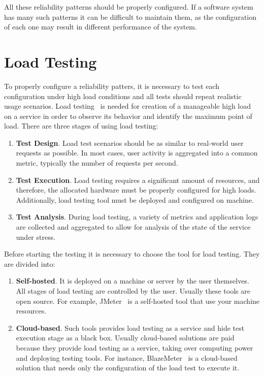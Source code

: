 All these reliability patterns should be properly configured. If a software system has many such patterns it can be difficult to maintain them, as the configuration of each one may result in different performance of the system.

\section{Load Testing}\label{sec:load-testing}
To properly configure a reliability patters, it is necessary to test each configuration under high load conditions and all tests should repeat realistic usage scenarios. Load testing~\cite{load_testing_tips} is needed for creation of a manageable high load on a service in order to observe its behavior and identify the maximum point of load. There are three stages of using load testing:

\begin{enumerate}
    \item \textbf{Test Design}. Load test scenarios should be as similar to real-world user requests as possible. In most cases, user activity is aggregated into a common metric, typically the number of requests per second.
    \item \textbf{Test Execution}. Load testing requires a significant amount of resources, and therefore, the allocated hardware must be properly configured for high loads. Additionally, load testing tool must be deployed and configured on machine.
    \item \textbf{Test Analysis}. During load testing, a variety of metrics and application logs are collected and aggregated to allow for analysis of the state of the service under stress.
\end{enumerate}

Before starting the testing it is necessary to choose the tool for load testing. They are divided into:
\begin{enumerate}
    \item \textbf{Self-hosted}. It is deployed on a machine or server by the user themselves. All stages of load testing are controlled by the user. Usually these tools are open source. For example, JMeter~\cite{jmeter} is a self-hosted tool that use your machine resources.
    \item \textbf{Cloud-based}. Such tools provides load testing as a service and hide test execution stage as a black box. Usually cloud-based solutions are paid because they provide load testing as a service, taking over computing power and deploying testing tools. For instance, BlazeMeter~\cite{blazemeter} is a cloud-based solution that needs only the configuration of the load test to execute it.
\end{enumerate}

